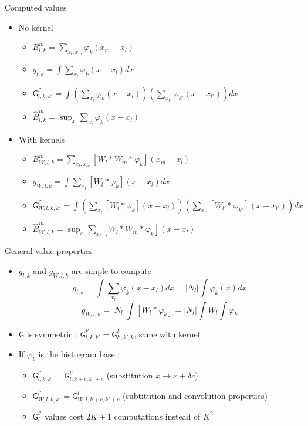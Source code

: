 \documentclass{beamer}
\newcommand\Convolution{\ast}
\begin{document}
\begin{frame}{Computed values}
    \begin{itemize}
        \item No kernel
        \begin{itemize}
            \item $B_{l,k}^m = \sum_{x_l,x_m} \varphi_k (x_m - x_l)$
            \item $g_{l,k} = \int \sum_{x_l} \varphi_k (x - x_l) dx$
            \item $\mathsf{G}_{l,k,k'}^{l'} = \int (\sum_{x_l} \varphi_k (x - x_l)) (\sum_{x_{l'}} \varphi_{k'} (x - x_{l'})) dx$
            \item $\hat{B}_{l,k}^m = \sup_x \sum_{x_l} \varphi_k (x - x_l)$
        \end{itemize}
        \item With kernels
        \begin{itemize}
            \item $B_{W,l,k}^m = \sum_{x_l,x_m} [ W_l \Convolution W_m \Convolution \varphi_k ] (x_m - x_l)$
            \item $g_{W,l,k} = \int \sum_{x_l} [ W_l \Convolution \varphi_k ] (x - x_l) dx$
            \item $\mathsf{G}_{W,l,k,k'}^{l'} = \int (\sum_{x_l} [ W_l \Convolution \varphi_k ] (x - x_l)) (\sum_{x_{l'}} [ W_{l'} \Convolution \varphi_{k'} ] (x - x_{l'})) dx$
            \item $\hat{B}_{W,l,k}^m = \sup_x \sum_{x_l} [ W_l \Convolution W_m \Convolution \varphi_k ] (x - x_l)$
        \end{itemize}
    \end{itemize}
\end{frame}

\begin{frame}{General value properties}
    \begin{itemize}
        \item $g_{l,k}$ and $g_{W,l,k}$ are simple to compute
        \[ g_{l,k} = \int \sum_{x_l} \varphi_k (x - x_l) dx = |N_l| \int \varphi_k(x) dx \]
        \[ g_{W,l,k} = |N_l| \int [ W_l \Convolution \varphi_k ] = |N_l| \int W_l \int \varphi_k \]

        \item $\mathsf{G}$ is symmetric : $\mathsf{G}_{l,k,k'}^{l'} = \mathsf{G}_{l',k',k}^{l}$, same with kernel

        \item If $\varphi_k$ is the histogram base :
        \begin{itemize}
            \item $\mathsf{G}_{l,k,k'}^{l'} = \mathsf{G}_{l,k+c,k'+c}^{l'}$ (substitution  $x \rightarrow x + \delta c$)
            \item $\mathsf{G}_{W,l,k,k'}^{l'} = \mathsf{G}_{W,l,k+c,k'+c}^{l'}$ (subtitution and convolution properties)
            \item $\mathsf{G}_{l}^{l'}$ values cost $2K+1$ computations instead of $K^2$
        \end{itemize}
    \end{itemize}
\end{frame}
\end{document}
